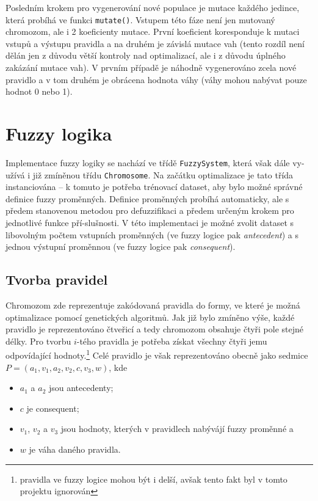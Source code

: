 \documentclass{article}
\begin{document}
Posledním krokem pro vygenerování nové populace je mutace každého jedince, která probíhá ve funkci \texttt{mutate()}. Vstupem této fáze není jen mutovaný chromozom, ale i 2 koeficienty mutace. První koeficient koresponduje k mutaci vstupů a výstupu pravidla a na druhém je závislá mutace vah (tento rozdíl není dělán jen z důvodu větší kontroly nad optimalizací, ale i z důvodu úplného zakázání mutace vah). V prvním případě je náhodně vygenerováno zcela nové pravidlo a v tom druhém je obrácena hodnota váhy (váhy mohou nabývat pouze hodnot 0 nebo 1).

\section{Fuzzy logika}

Implementace fuzzy logiky se nachází ve třídě \texttt{FuzzySystem}, která však dále vy-užívá i již zmíněnou třídu \texttt{Chromosome}. Na začátku optimalizace je tato třída instanciována -- k tomuto je potřeba trénovací dataset, aby bylo možné správné definice fuzzy proměnných. Definice proměnných probíhá automaticky, ale s předem stanovenou metodou pro defuzzifikaci a předem určeným krokem pro jednotlivé funkce pří-slušnosti. V této implementaci je možné zvolit dataset s libovolným počtem vstupních proměnných (ve fuzzy logice pak \emph{antecedent}) a s jednou výstupní proměnnou (ve fuzzy logice pak \emph{consequent}).

\subsection{Tvorba pravidel}\label{rules}

Chromozom zde reprezentuje zakódovaná pravidla do formy, ve které je možná optimalizace pomocí genetických algoritmů. Jak již bylo zmíněno výše, každé pravidlo je reprezentováno čtveřicí a tedy chromozom obsahuje čtyři pole stejné délky. Pro tvorbu $i$-tého pravidla je potřeba získat všechny čtyři jemu odpovídající hodnoty.\footnote{pravidla ve fuzzy logice mohou být i delší, avšak tento fakt byl v tomto projektu ignorován} Celé pravidlo je však reprezentováno obecně jako sedmice $P = (a_1, v_1, a_2, v_2, c, v_3, w)$, kde

\begin{itemize}
    \samepage
    \item $a_1$ a $a_2$ jsou antecedenty;
    \item $c$ je consequent;
    \item $v_1$, $v_2$ a $v_3$ jsou hodnoty, kterých v pravidlech nabývájí fuzzy proměnné a
    \item $w$ je váha daného pravidla.
\end{itemize}
\end{document}
